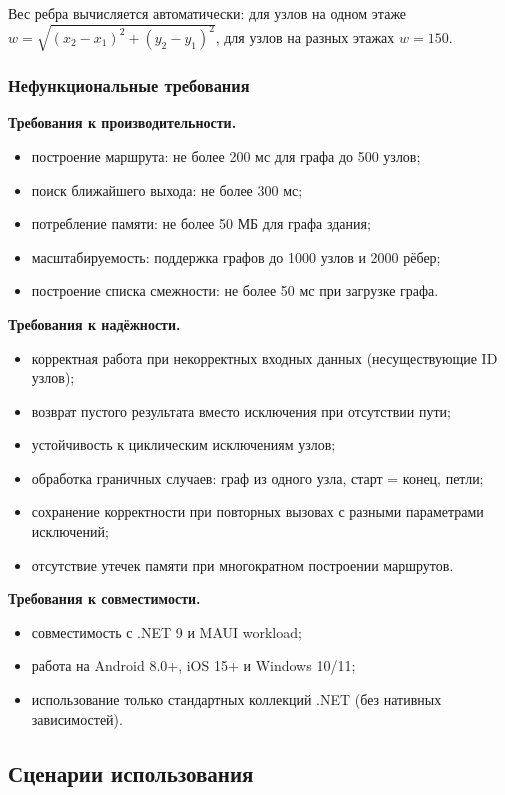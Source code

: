 Вес ребра вычисляется автоматически: для узлов на одном этаже $w = \sqrt{(x_2 - x_1)^2 + (y_2 - y_1)^2}$, для узлов на разных этажах $w = 150$.

\subsubsection{Нефункциональные требования}

\textbf{Требования к производительности.}
\begin{itemize}
\item построение маршрута: не более 200 мс для графа до 500 узлов;
\item поиск ближайшего выхода: не более 300 мс;
\item потребление памяти: не более 50 МБ для графа здания;
\item масштабируемость: поддержка графов до 1000 узлов и 2000 рёбер;
\item построение списка смежности: не более 50 мс при загрузке графа.
\end{itemize}

\textbf{Требования к надёжности.}
\begin{itemize}
\item корректная работа при некорректных входных данных (несуществующие ID узлов);
\item возврат пустого результата вместо исключения при отсутствии пути;
\item устойчивость к циклическим исключениям узлов;
\item обработка граничных случаев: граф из одного узла, старт = конец, петли;
\item сохранение корректности при повторных вызовах с разными параметрами исключений;
\item отсутствие утечек памяти при многократном построении маршрутов.
\end{itemize}

\textbf{Требования к совместимости.}
\begin{itemize}
\item совместимость с .NET 9 и MAUI workload;
\item работа на Android 8.0+, iOS 15+ и Windows 10/11;
\item использование только стандартных коллекций .NET (без нативных зависимостей).
\end{itemize}

\subsection{Сценарии использования}

